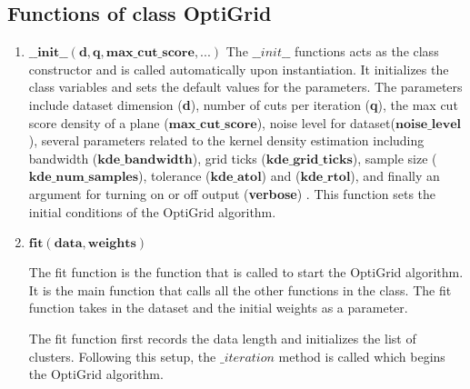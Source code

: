 \subsection{Functions of class OptiGrid}
\begin{enumerate}    
    \item $\mathbf{\_\_init\_\_(d, q, max\_cut\_score, ...)}$\newline
    {The $\_\_init\_\_$ functions acts as the class constructor and is called automatically upon instantiation. It initializes the class variables and sets the default values for the parameters. 
    The parameters include dataset dimension (\textbf{d}), number of cuts per iteration (\textbf{q}), the max cut score density of a plane ({$\mathbf{max\_cut\_score}$}), 
    noise level for dataset($\mathbf{noise\_level}$), several parameters related to the kernel density estimation including bandwidth ($\mathbf{kde\_bandwidth}$), 
    grid ticks ($\mathbf{kde\_grid\_ticks}$), sample size ($\mathbf{kde\_num\_samples}$), tolerance ($\mathbf{kde\_atol}$) and ($\mathbf{kde\_rtol}$), 
    and finally an argument for turning on or off output (\textbf{verbose}) . This function sets the initial conditions of the OptiGrid algorithm.}
    \item $\mathbf{fit(data, weights)}$\newline
    {The fit function is the function that is called to start the OptiGrid algorithm. 
    It is the main function that calls all the other functions in the class.
    The fit function takes in the dataset and the initial weights as a parameter.\par
    The fit function first records the data length and initializes the list of clusters. Following this setup, the $\_iteration$ method is called which begins the OptiGrid algorithm.}
    

\end{enumerate}
